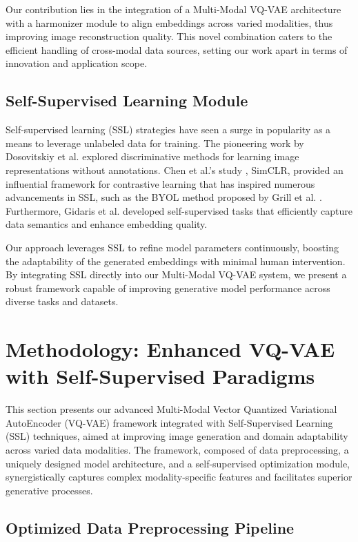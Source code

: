 \documentclass{article} %
\begin{document}
Our contribution lies in the integration of a Multi-Modal VQ-VAE architecture with a harmonizer module to align embeddings across varied modalities, thus improving image reconstruction quality. This novel combination caters to the efficient handling of cross-modal data sources, setting our work apart in terms of innovation and application scope.

\subsection{Self-Supervised Learning Module}

Self-supervised learning (SSL) strategies have seen a surge in popularity as a means to leverage unlabeled data for training. The pioneering work by Dosovitskiy et al. \citep{dosovitskiy2015discriminative} explored discriminative methods for learning image representations without annotations. Chen et al.'s study \citep{chen2020simple}, SimCLR, provided an influential framework for contrastive learning that has inspired numerous advancements in SSL, such as the BYOL method proposed by Grill et al. \citep{grill2020bootstrap}. Furthermore, Gidaris et al. \citep{gidaris2018unsupervised} developed self-supervised tasks that efficiently capture data semantics and enhance embedding quality.

Our approach leverages SSL to refine model parameters continuously, boosting the adaptability of the generated embeddings with minimal human intervention. By integrating SSL directly into our Multi-Modal VQ-VAE system, we present a robust framework capable of improving generative model performance across diverse tasks and datasets.



\section{Methodology: Enhanced VQ-VAE with Self-Supervised Paradigms}

This section presents our advanced Multi-Modal Vector Quantized Variational AutoEncoder (VQ-VAE) framework integrated with Self-Supervised Learning (SSL) techniques, aimed at improving image generation and domain adaptability across varied data modalities. The framework, composed of data preprocessing, a uniquely designed model architecture, and a self-supervised optimization module, synergistically captures complex modality-specific features and facilitates superior generative processes.

\subsection{Optimized Data Preprocessing Pipeline}
\end{document}
